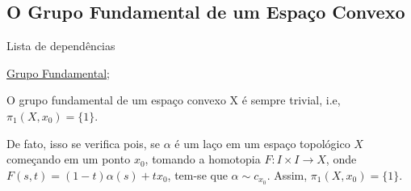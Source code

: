 \subsection{O Grupo Fundamental de um Espaço Convexo}
\label{grupo-fundamental-convexo}
\begin{titlemize}{Lista de dependências}
	\item \hyperref[grupo-fundamental-def]{Grupo Fundamental};\\ %
\end{titlemize}

\begin{ex}
O grupo fundamental de um espaço convexo X é sempre trivial, i.e, $\pi_1(X, x_0) = \{ 1\}$.
\end{ex}

De fato, isso se verifica pois, se $\alpha$ é um laço em um espaço topológico $X$ começando em um ponto $x_0$, tomando a homotopia $F:I \times I \longrightarrow X$, onde $F(s,t) = (1 - t)\alpha(s) + tx_0$, tem-se que $\alpha \sim c_{x_0}$. Assim, $\pi_1(X, x_0) = \{1\}$.



